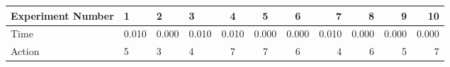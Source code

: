 \documentclass[8pt]{article}
\begin{document}
\begin{landscape}
\begin{tabular}{ | l | l | l | l | c | c | c | r | r | r | r | }
 \hline 
Experiment Number & 1 & 2 & 3 & 4 & 5 & 6 & 7 & 8 & 9 & 10\\ \hline
Time & 0.010 & 0.000 & 0.010 & 0.010 & 0.000 & 0.000 & 0.010 & 0.000 & 0.000 & 0.000\\ \hline
Action & 5 & 3 & 4 & 7 & 7 & 6 & 4 & 6 & 5 & 7\\ \hline\end{tabular}
\end{landscape}
\end{document}
